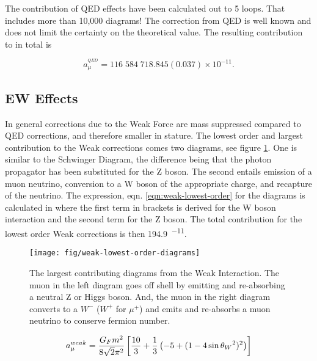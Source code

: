 The contribution of QED effects have been calculated out to 5 loops\cite{5-loop-qed}.  That includes more than 10,000 diagrams!  The correction from QED is well known and does not limit the certainty on the theoretical value.  The resulting contribution to \mugmtwo in total is

\begin{equation}
\label{eqn:qed-total}
a_\mu^{^{QED}} = 116\;584\;718.845(0.037) \times 10^{-11}.
\end{equation}

\subsection{EW Effects} \label{s-sec:theory-ew}

In general corrections due to the Weak Force are mass suppressed compared to QED corrections, and therefore smaller in stature.  The lowest order and largest contribution to the Weak corrections comes two diagrams, see figure \ref{fig:weak-lowest-order-diagrams}. One is similar to the Schwinger Diagram, the difference being that the photon propagator has been substituted for the Z boson.  The second entails emission of a muon neutrino, conversion to a W boson of the appropriate charge, and recapture of the neutrino.  The expression, eqn. \ref{eqn:weak-lowest-order} for the diagrams is calculated in\cite{the-muon-g-2} where the first term in brackets is derived for the W boson interaction and the second term for the Z boson.  The total contribution for the lowest order Weak corrections is then \SI{194.9}{^{-11}}.

\begin{figure}
\label{fig:weak-lowest-order-diagrams}
\centering
\texttt{[image: fig/weak-lowest-order-diagrams]}
\caption{The largest contributing diagrams from the Weak Interaction.  The muon in the left diagram goes off shell by emitting and re-absorbing a neutral Z or Higgs boson.  And, the muon in the right diagram converts to a $W^{-}$ ($W^{+}$ for $\mu^{+}$) and emits and re-absorbs a muon neutrino to conserve fermion number.}
\end{figure}

\begin{equation}
\label{eqn:weak-lowest-order}
a_\mu^{weak} = \frac{G_F m^2}{8\sqrt{2}\pi^2} \\
\left[\frac{10}{3} + \frac{1}{3} \left(-5 + (1 - 4\sin{\theta_W}^2)^2 \right) \right]
\end{equation}

